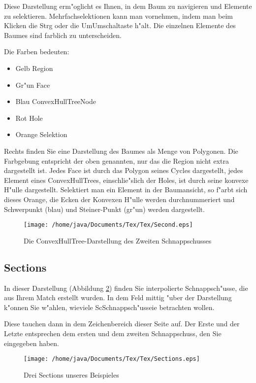 Diese Darstellung erm"oglicht es Ihnen, in dem Baum zu navigieren und Elemente zu selektieren. Mehrfachselektionen kann man vornehmen, indem man beim Klicken die Strg oder die UmUmschaltaste h"alt. Die einzelnen Elemente des Baumes sind farblich zu unterscheiden.

Die Farben bedeuten:
\begin{itemize}
\item Gelb Region
\item Gr"un Face
\item Blau ConvexHullTreeNode
\item Rot Hole
\item Orange Selektion
\end{itemize} 

Rechts finden Sie eine Darstellung des Baumes als Menge von Polygonen. Die Farbgebung entspricht der oben genannten, nur das die Region nicht extra dargestellt ist. Jedes Face ist durch das Polygon seines Cycles dargestellt, jedes Element eines ConvexHullTrees, einschlie"slich der Holes, ist durch seine konvexe H"ulle dargestellt. Selektiert man ein Element in der Baumansicht, so f"arbt sich dieses Orange, die Ecken der Konvexen H"ulle werden durchnummeriert und Schwerpunkt (blau) und Steiner-Punkt (gr"un) werden dargestellt.

\begin{figure}
   \centering
   \texttt{[image: /home/java/Documents/Tex/Tex/Second.eps]}
   \caption{Die ConvexHullTree-Darstellung des Zweiten Schnappschusses}
   \label{fig:Second}
\end{figure}
\subsection{Sections}
In dieser Darstellung (Abbildung \ref{fig:Sections}) finden Sie interpolierte Schnappsch"usse, die aus Ihrem Match erstellt wurden. In dem Feld mittig "uber der Darstellung k"onnen Sie w"ahlen, wieviele ScSchnappsch"usseie betrachten wollen. 

Diese tauchen dann in dem Zeichenbereich dieser Seite auf. Der Erste und der Letzte entsprechen dem ersten und dem zweiten Schnappschuss, den Sie eingegeben haben.
\begin{figure}
   \centering
   \texttt{[image: /home/java/Documents/Tex/Tex/Sections.eps]}
   \caption{Drei Sections unseres Beispieles}
   \label{fig:Sections}
\end{figure}
